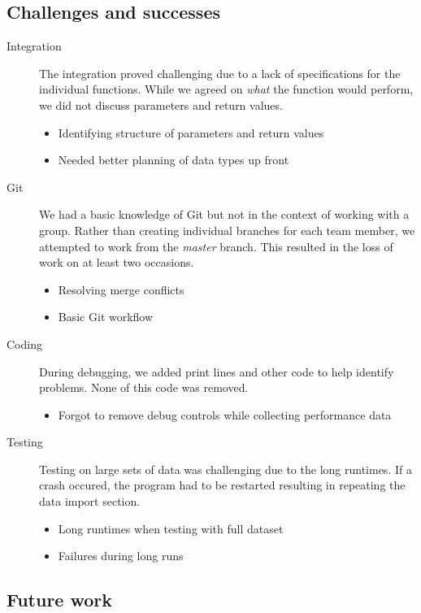 \documentclass{article}
\begin{document}
\subsection{Challenges and successes}

\begin{description}
    \item [Integration]{The integration proved challenging due to a lack of specifications for the individual functions. While we agreed on \textit{what} the function would perform, we did not discuss parameters and return values.}
		\begin{itemize}
			\item Identifying structure of parameters and return values
			\item Needed better planning of data types up front
		\end{itemize}
    \item [Git]{We had a basic knowledge of Git but not in the context of working with a group. Rather than creating individual branches for each team member, we attempted to work from the \textit{master} branch. This resulted in the loss of work on at least two occasions.}
		\begin{itemize}
			\item Resolving merge conflicts
			\item Basic Git workflow
		\end{itemize}
    \item [Coding]{During debugging, we added print lines and other code to help identify problems. None of this code was removed.}
		\begin{itemize}
			\item Forgot to remove debug controls while collecting performance data
		\end{itemize}
    \item [Testing]{Testing on large sets of data was challenging due to the long runtimes. If a crash occured, the program had to be restarted resulting in repeating the data import section.}
		\begin{itemize}
			\item Long runtimes when testing with full dataset
			\item Failures during long runs
		\end{itemize}
\end{description}

\subsection{Future work}
\end{document}
